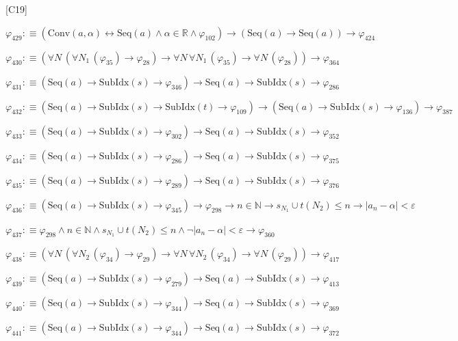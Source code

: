\begin{fullproof}{[C19]}
\begin{abbrevlist}
\item $\varphi_{429} :\equiv (\mathrm{Conv}(a,\alpha) \leftrightarrow \mathrm{Seq}(a) \land \alpha \in \mathbb{R} \land \varphi_{102}) \to (\mathrm{Seq}(a) \to \mathrm{Seq}(a)) \to \varphi_{424}$
\item $\varphi_{430} :\equiv (\forall N\,(\forall N_{1}\,(\varphi_{35}) \to \varphi_{28}) \to \forall N\,\forall N_{1}\,(\varphi_{35}) \to \forall N\,(\varphi_{28})) \to \varphi_{364}$
\item $\varphi_{431} :\equiv (\mathrm{Seq}(a) \to \mathrm{SubIdx}(s) \to \varphi_{346}) \to \mathrm{Seq}(a) \to \mathrm{SubIdx}(s) \to \varphi_{286}$
\item $\varphi_{432} :\equiv (\mathrm{Seq}(a) \to \mathrm{SubIdx}(s) \to \mathrm{SubIdx}(t) \to \varphi_{109}) \to (\mathrm{Seq}(a) \to \mathrm{SubIdx}(s) \to \varphi_{136}) \to \varphi_{387}$
\item $\varphi_{433} :\equiv (\mathrm{Seq}(a) \to \mathrm{SubIdx}(s) \to \varphi_{302}) \to \mathrm{Seq}(a) \to \mathrm{SubIdx}(s) \to \varphi_{352}$
\item $\varphi_{434} :\equiv (\mathrm{Seq}(a) \to \mathrm{SubIdx}(s) \to \varphi_{286}) \to \mathrm{Seq}(a) \to \mathrm{SubIdx}(s) \to \varphi_{375}$
\item $\varphi_{435} :\equiv (\mathrm{Seq}(a) \to \mathrm{SubIdx}(s) \to \varphi_{289}) \to \mathrm{Seq}(a) \to \mathrm{SubIdx}(s) \to \varphi_{376}$
\item $\varphi_{436} :\equiv (\mathrm{Seq}(a) \to \mathrm{SubIdx}(s) \to \varphi_{345}) \to \varphi_{298} \to n \in \mathbb{N} \to s_{N_{1}} \cup t(N_{2}) \leq n \to \lvert a_{n} - \alpha \rvert < \varepsilon$
\item $\varphi_{437} :\equiv \varphi_{298} \land n \in \mathbb{N} \land s_{N_{1}} \cup t(N_{2}) \leq n \land \neg \lvert a_{n} - \alpha \rvert < \varepsilon \to \varphi_{360}$
\item $\varphi_{438} :\equiv (\forall N\,(\forall N_{2}\,(\varphi_{34}) \to \varphi_{29}) \to \forall N\,\forall N_{2}\,(\varphi_{34}) \to \forall N\,(\varphi_{29})) \to \varphi_{417}$
\item $\varphi_{439} :\equiv (\mathrm{Seq}(a) \to \mathrm{SubIdx}(s) \to \varphi_{279}) \to \mathrm{Seq}(a) \to \mathrm{SubIdx}(s) \to \varphi_{413}$
\item $\varphi_{440} :\equiv (\mathrm{Seq}(a) \to \mathrm{SubIdx}(s) \to \varphi_{344}) \to \mathrm{Seq}(a) \to \mathrm{SubIdx}(s) \to \varphi_{369}$
\item $\varphi_{441} :\equiv (\mathrm{Seq}(a) \to \mathrm{SubIdx}(s) \to \varphi_{344}) \to \mathrm{Seq}(a) \to \mathrm{SubIdx}(s) \to \varphi_{372}$

\end{abbrevlist}
\end{fullproof}

